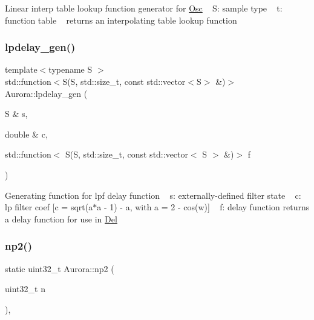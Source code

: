Linear interp table lookup function generator for \hyperlink{class_aurora_1_1_osc}{Osc} ~\newline
S\+: sample type ~\newline
t\+: function table ~\newline
returns an interpolating table lookup function \mbox{\label{namespace_aurora_a8a142312f627aaa19ba0e8a87f33d00b}} 
\subsubsection{\texorpdfstring{lpdelay\+\_\+gen()}{lpdelay\_gen()}}
{\footnotesize\ttfamily template$<$typename S $>$ \\
std\+::function$<$S(S, std\+::size\+\_\+t, const std\+::vector$<$S$>$ \&)$>$ Aurora\+::lpdelay\+\_\+gen (\begin{DoxyParamCaption}\item[{S \&}]{s,  }\item[{double \&}]{c,  }\item[{std\+::function$<$ S(S, std\+::size\+\_\+t, const std\+::vector$<$ S $>$ \&)$>$}]{f }\end{DoxyParamCaption})}

Generating function for lpf delay function ~\newline
s\+: externally-\/defined filter state ~\newline
c\+: lp filter coef \mbox{[}c = sqrt(a$\ast$a -\/ 1) -\/ a, with a = 2 -\/ cos(w)\mbox{]} ~\newline
f\+: delay function returns a delay function for use in \hyperlink{class_aurora_1_1_del}{Del} \mbox{\label{namespace_aurora_a49b6f6d92479d80271ced42627154066}} 
\subsubsection{\texorpdfstring{np2()}{np2()}}
{\footnotesize\ttfamily static uint32\+\_\+t Aurora\+::np2 (\begin{DoxyParamCaption}\item[{uint32\+\_\+t}]{n }\end{DoxyParamCaption})\hspace{0.3cm}{\ttfamily [inline]}, {\ttfamily [static]}}

